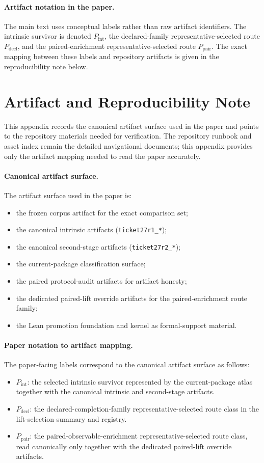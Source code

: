 \documentclass[11pt]{article}
\theoremstyle{definition}
\begin{document}
\paragraph{Artifact notation in the paper.}
The main text uses conceptual labels rather than raw artifact identifiers. The intrinsic survivor is denoted $P_{\mathrm{int}}$, the declared-family representative-selected route $P_{\mathrm{decl}}$, and the paired-enrichment representative-selected route $P_{\mathrm{pair}}$. The exact mapping between these labels and repository artifacts is given in the reproducibility note below.
 \section{Artifact and Reproducibility Note}\label{app:repro}

This appendix records the canonical artifact surface used in the paper and points to the repository materials needed for verification. The repository runbook and asset index remain the detailed navigational documents; this appendix provides only the artifact mapping needed to read the paper accurately.

\paragraph{Canonical artifact surface.}
The artifact surface used in the paper is:
\begin{itemize}
\item the frozen corpus artifact for the exact comparison set;
\item the canonical intrinsic artifacts (\texttt{ticket27r1\_*});
\item the canonical second-stage artifacts (\texttt{ticket27r2\_*});
\item the current-package classification surface;
\item the paired protocol-audit artifacts for artifact honesty;
\item the dedicated paired-lift override artifacts for the paired-enrichment route family;
\item the Lean promotion foundation and kernel as formal-support material.
\end{itemize}

\paragraph{Paper notation to artifact mapping.}
The paper-facing labels correspond to the canonical artifact surface as follows:
\begin{itemize}
\item $P_{\mathrm{int}}$: the selected intrinsic survivor represented by the current-package atlas together with the canonical intrinsic and second-stage artifacts.
\item $P_{\mathrm{decl}}$: the declared-completion-family representative-selected route class in the lift-selection summary and registry.
\item $P_{\mathrm{pair}}$: the paired-observable-enrichment representative-selected route class, read canonically only together with the dedicated paired-lift override artifacts.
\end{itemize}
\end{document}
